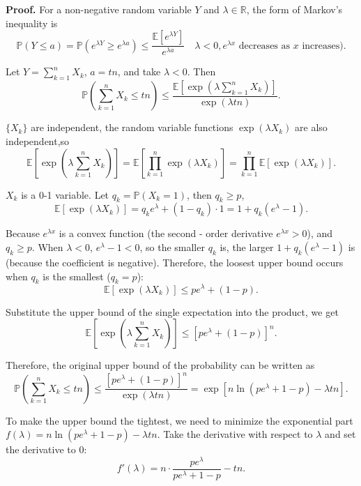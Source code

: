 \documentclass[a4paper, 11pt]{article}
\newenvironment{solution}
    {\textbf{Proof.}}
    {}
\begin{document}
\begin{solution}
For a non-negative random variable \( Y \) and \( \lambda \in \mathbb{R} \), the form of Markov's inequality is
$$
\mathbb{P}(Y \leq a) = \mathbb{P}\left(e^{\lambda Y} \geq e^{\lambda a}\right) \leq \frac{\mathbb{E}\left[e^{\lambda Y}\right]}{e^{\lambda a}} \quad \lambda < 0 , e^{\lambda x} \text{ decreases as } x \text{ increases)}.
$$

Let \( Y = \sum_{k = 1}^n X_k \), \( a = tn \), and take \( \lambda < 0 \). Then
$$
\mathbb{P}\left(\sum_{k = 1}^n X_k \leq tn\right) \leq \frac{\mathbb{E}\left[\exp\left(\lambda \sum_{k = 1}^n X_k\right)\right]}{\exp(\lambda tn)}.
$$

\( \{X_k\}\) are independent, the random variable functions \(\exp(\lambda X_k)\) are also independent,so
$$
\mathbb{E}\left[\exp\left(\lambda \sum_{k = 1}^n X_k\right)\right] = \mathbb{E}\left[\prod_{k = 1}^n \exp(\lambda X_k)\right] = \prod_{k = 1}^n \mathbb{E}\left[\exp(\lambda X_k)\right].
$$

\( X_k \) is a 0-1 variable. Let \( q_k = \mathbb{P}(X_k = 1) \), then \( q_k \geq p \),
$$
\mathbb{E}\left[\exp(\lambda X_k)\right] = q_k e^\lambda + (1 - q_k) \cdot 1 = 1 + q_k(e^\lambda - 1).
$$

Because \( e^{\lambda x} \) is a convex function (the second - order derivative \( e^{\lambda x}>0 \)), and \( q_k \geq p \). When \( \lambda < 0 \), \( e^\lambda - 1 < 0 \), so the smaller \( q_k \) is, the larger \( 1 + q_k(e^\lambda - 1) \) is (because the coefficient is negative). Therefore, the loosest upper bound occurs when \( q_k \) is the smallest (\( q_k = p \)):
$$
\mathbb{E}\left[\exp(\lambda X_k)\right] \leq p e^\lambda + (1 - p).
$$

Substitute the upper bound of the single expectation into the product, we get
$$
\mathbb{E}\left[\exp\left(\lambda \sum_{k = 1}^n X_k\right)\right] \leq \left[p e^\lambda + (1 - p)\right]^n.
$$

Therefore, the original upper bound of the probability can be written as
$$
\mathbb{P}\left(\sum_{k = 1}^n X_k \leq tn\right) \leq \frac{\left[p e^\lambda + (1 - p)\right]^n}{\exp(\lambda tn)} = \exp\left[n \ln\left(p e^\lambda + 1 - p\right) - \lambda tn\right].
$$

To make the upper bound the tightest, we need to minimize the exponential part \( f(\lambda) = n\ln\left(pe^\lambda + 1 - p\right) - \lambda tn \). Take the derivative with respect to \( \lambda \) and set the derivative to 0:
$$
f'(\lambda) = n \cdot \frac{pe^\lambda}{pe^\lambda + 1 - p} - tn.
$$


\end{solution}
\end{document}
